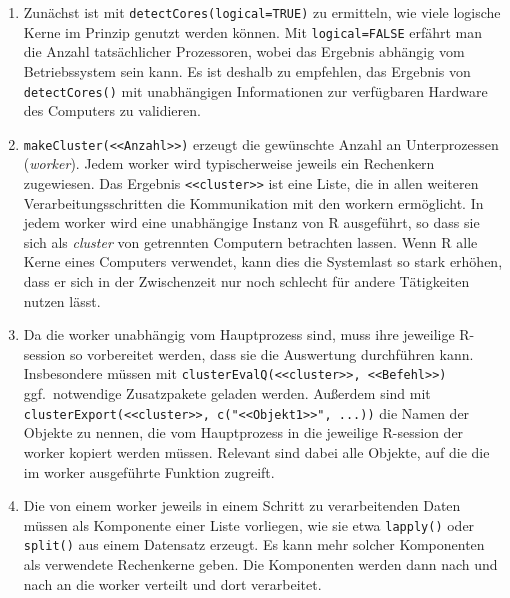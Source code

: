 \begin{enumerate}
\item Zunächst ist mit \lstinline!detectCores(logical=TRUE)! zu ermitteln, wie viele logische Kerne im Prinzip genutzt werden können. Mit \lstinline!logical=FALSE! erfährt man die Anzahl tatsächlicher Prozessoren, wobei das Ergebnis abhängig vom Betriebssystem sein kann. Es ist deshalb zu empfehlen, das Ergebnis von \lstinline!detectCores()! mit unabhängigen Informationen zur verfügbaren Hardware des Computers zu validieren.
\item \label{item:par_mc} \lstinline!makeCluster(<<Anzahl>>)! erzeugt die gewünschte Anzahl an Unterprozessen (\emph{worker}). Jedem worker wird typischerweise jeweils ein Rechenkern zugewiesen. Das Ergebnis \lstinline!<<cluster>>! ist eine Liste, die in allen weiteren Verarbeitungsschritten die Kommunikation mit den workern ermöglicht. In jedem worker wird eine unabhängige Instanz von R ausgeführt, so dass sie sich als \emph{cluster} von getrennten Computern betrachten lassen. Wenn R alle Kerne eines Computers verwendet, kann dies die Systemlast so stark erhöhen, dass er sich in der Zwischenzeit nur noch schlecht für andere Tätigkeiten nutzen lässt.
\item \label{item:par_ceq} Da die worker unabhängig vom Hauptprozess sind, muss ihre jeweilige R-session so vorbereitet werden, dass sie die Auswertung durchführen kann. Insbesondere müssen mit \lstinline!clusterEvalQ(<<cluster>>, <<Befehl>>)! ggf.\ notwendige Zusatzpakete geladen werden. Außerdem sind mit \lstinline!clusterExport(<<cluster>>, c("<<Objekt1>>", ...))! die Namen der Objekte zu nennen, die vom Hauptprozess in die jeweilige R-session der worker kopiert werden müssen. Relevant sind dabei alle Objekte, auf die die im worker ausgeführte Funktion zugreift.
\item Die von einem worker jeweils in einem Schritt zu verarbeitenden Daten müssen als Komponente einer Liste vorliegen, wie sie etwa \lstinline!lapply()! oder \lstinline!split()! aus einem Datensatz erzeugt. Es kann mehr solcher Komponenten als verwendete Rechenkerne geben. Die Komponenten werden dann nach und nach an die worker verteilt und dort verarbeitet.

\end{enumerate}
